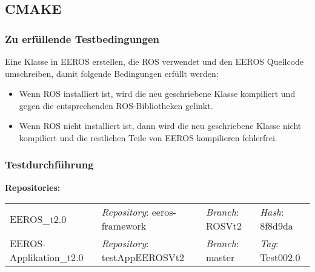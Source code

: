 \subsection{CMAKE}
\subsubsection{Zu erfüllende Testbedingungen}
Eine Klasse in EEROS erstellen, die ROS verwendet und den EEROS Quellcode umschreiben, damit folgende Bedingungen erfüllt werden:
\begin{itemize}
\item Wenn ROS installiert ist, wird die neu geschriebene Klasse kompiliert und gegen die entsprechenden ROS-Bibliotheken gelinkt.
\item Wenn ROS nicht installiert ist, dann wird die neu geschriebene Klasse nicht kompiliert und die restlichen Teile von EEROS kompilieren fehlerfrei.
\end{itemize}

\subsubsection{Testdurchführung}
\textbf{Repositories:} \\
\begin{tabular}
  { l						| l			 							l								 l								}

  EEROS\_t2.0				& \textit{Repository}: eeros-framework	& \textit{Branch}: ROSVt2		& \textit{Hash}: 8f8d9da		\\
  EEROS-Applikation\_t2.0	& \textit{Repository}: testAppEEROSVt2	& \textit{Branch}: master		& \textit{Tag}: Test002.0 		\\
\end{tabular}

